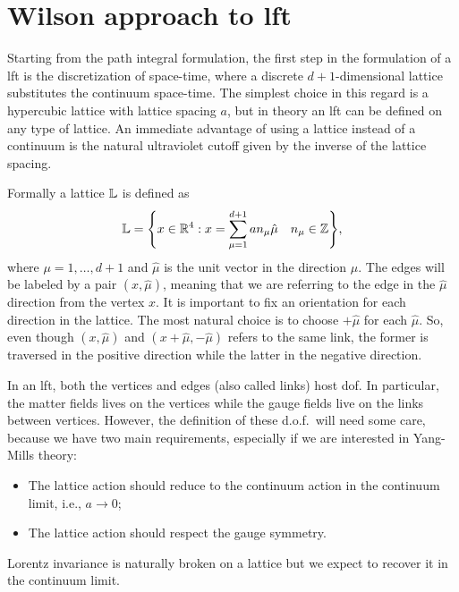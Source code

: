 \section{Wilson approach to \acl{lft}}
\label{sec:wilson_approach_to_lft}



Starting from the path integral formulation, the first step in the formulation of a \ac{lft} is the discretization of space-time, where a discrete $d+1$-dimensional lattice substitutes the continuum space-time.
The simplest choice in this regard is a hypercubic lattice with lattice spacing $a$, but in theory an \ac{lft} can be defined on any type of lattice.
An immediate advantage of using a lattice instead of a continuum is the natural ultraviolet cutoff given by the inverse of the lattice spacing.

Formally a lattice $\mathbb{L}$ is defined as
\begin{equation}
    \mathbb{L} = \qty{
        x \in \mathbb{R}^4 :
        x = \sum_{\mu = 1}^{d+1} a n_{\mu} \hat{\mu} \quad
        n_{\mu} \in \mathbb{Z}},
\end{equation}
where $\mu = 1, \dots, d+1$ and $\hat{\mu}$ is the unit vector in the direction $\mu$.
The edges will be labeled by a pair $(x,\hat{\mu})$, meaning that we are referring to the edge in the $\hat{\mu}$ direction from the vertex $x$.
It is important to fix an orientation for each direction in the lattice.
The most natural choice is to choose $+ \hat{\mu}$ for each $\hat{\mu}$.
So, even though $(x,\hat{\mu})$ and $(x + \hat{\mu}, - \hat{\mu})$ refers to the same link, the former is traversed in the positive direction while the latter in the negative direction.

In an \ac{lft}, both the vertices and edges (also called links) host \ac{dof}.
In particular, the matter fields lives on the vertices while the gauge fields live on the links between vertices.
However, the definition of these d.o.f.~will need some care, because we have two main requirements, especially if we are interested in Yang-Mills theory:
\begin{itemize}
    \item The lattice action should reduce to the continuum action in the continuum limit, i.e., $a \to 0$;
    \item The lattice action should respect the gauge symmetry.
\end{itemize}
Lorentz invariance is naturally broken on a lattice but we expect to recover it in the continuum limit.


